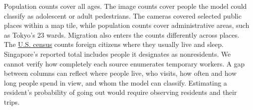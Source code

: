 \documentclass[11pt]{article}
\begin{document}
Population counts cover all ages. The image counts cover people the model could classify as adolescent or adult pedestrians. The cameras covered selected public places within a map tile, while population counts cover administrative areas, such as Tokyo’s 23 wards. Migration also enters the counts differently across places. The \href{https://www.census.gov/programs-surveys/decennial-census/decade/2020/about/residence-rule.html}{U.S. census} counts foreign citizens where they usually live and sleep. Singapore’s reported total includes people it designates as nonresidents. We cannot verify how completely each source enumerates temporary workers. A gap between columns can reflect where people live, who visits, how often and how long people spend in view, and whom the model can classify. Estimating a resident’s probability of going out would require observing residents and their trips.

{\small\singlespacing

}
\end{document}
